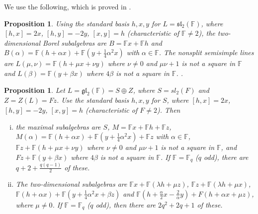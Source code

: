 \documentclass[11pt]{amsart}
\theoremstyle{plain}
\newtheorem{proposition}[theorem]{Proposition}
\def\F{\mathbb{F}}
\begin{document}
We use the following, which is proved in \cite[Proposition 4.2]{TZG}.

\begin{proposition}\label{comax1} 
Using the standard basis $h,x,y$ for $L= \mathfrak{sl}_2(\F)$, where $[h,x]=2x$, $[h,y]=-2y$, $[x,y]=h$ (characteristic of $\F\neq 2$), the two-dimensional Borel subalgebras are $B=\F x + \F h$ and $B(\alpha)=\F(h+\alpha x) + \F(y +\frac{1}{4} \alpha^2 x)$ with $\alpha \in \F$. The nonsplit semisimple lines are $L(\mu,\nu)=\F(h+\mu x+\nu y)$ where  $\nu\neq 0$ and $\mu\nu+1$ is not a square in $\F$ and $L(\beta)=\F(y +\beta x)$ where $4\beta$ is not a square in $\F$. .
\end{proposition}

\begin{proposition}
Let $L= \mathfrak{gl}_2(\F)=S\oplus Z$, where $S=sl_2(F)$ and $Z=Z(L)=Fz$. Use the standard basis $h,x,y$ for $S$, where $[h,x]=2x$, $[h,y]=-2y$, $[x,y]=h$ (characteristic of $F\neq 2$). Then
\begin{enumerate}[(i)]
\item the maximal subalgebras are $S$, $M=\F x + \F h+\F z$, $M(\alpha)=\F (h+\alpha x) + \F (y +\frac{1}{4} \alpha^2 x)+\F z$ with $\alpha \in \F$, $\F z+\F (h+\mu x+\nu y)$ where  $\nu\neq 0$ and $\mu\nu+1$ is not a square in $\F$, and $F z+\F (y +\beta x)$ where $4\beta$ is not a square in $\F$. If $\F=\F_q$ ($q$ odd), there are $q+2+\frac{q(q-1)}{2}$ of these.
\item The two-dimensional subalgebras are $\F x+\F (\lambda h+\mu z)$, $\F z+\F (\lambda h+\mu x)$, $\F (h+\alpha x)+\F (y +\frac{1}{4} \alpha^2 x+\beta z)$ and $\F (h+\frac{\alpha}{2} x -\frac{2}{\alpha} y)+F(h+\alpha x+\mu z)$, where $\mu\not=0$. If $\F=\F_q$ ($q$ odd), then there are $2q^2+2q+1$ of these. 
\end{enumerate}
\end{proposition}
\end{document}
